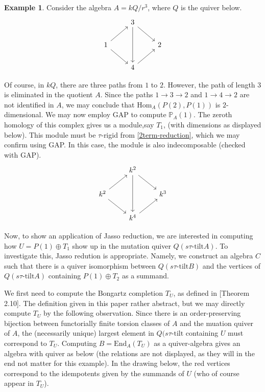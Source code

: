 \documentclass[]{article}
\theoremstyle{definition}
\newtheorem{example}{Example}[section]
\newcommand{\tu}{\ensuremath{\tau}}
\begin{document}
\begin{example}
	Consider the algebra $A = kQ/r^3$, where $Q$ is the quiver below.
	\[\begin{tikzcd}
		& 3 \\
		1 && 2 \\
		& 4
		\arrow[from=2-1, to=1-2]
		\arrow[from=2-1, to=3-2]
		\arrow[from=3-2, to=2-3]
		\arrow[from=1-2, to=2-3]
		\arrow[from=1-2, to=3-2]
	\end{tikzcd}\]

	Of course, in $kQ$, there are three paths from $1$ to $2$. However, the path of length $3$ is eliminated in the quotient $A$. Since the paths $1 \to 3 \to 2$ and $1 \to 4 \to 2$ are not identified in $A$, we may conclude that $\text{Hom}_A(P(2),P(1))$ is $2$-dimensional. We may now employ GAP to compute $\mathbb{P}_A(1)$. The zeroth homology of this complex gives us a module,say $T_1$, (with dimensions as displayed below). This module must be \tu-rigid from \cref{2term-reduction}, which we may confirm using GAP. In this case, the module is also indecomposable (checked with GAP).
	\[\begin{tikzcd}
		& k^2 \\
		k^2 && k^3 \\
		& k^4
		\arrow[from=2-1, to=1-2]
		\arrow[from=2-1, to=3-2]
		\arrow[from=3-2, to=2-3]
		\arrow[from=1-2, to=2-3]
		\arrow[from=1-2, to=3-2]
	\end{tikzcd}\]

Now, to show an application of Jasso reduction, we are interested in computing how $U = P(1) \oplus T_1$ show up in the mutation quiver $Q(s\tu\text{-tilt} A)$. To investigate this, Jasso redution is appropriate. Namely, we construct an algebra $C$ such that there is a quiver isomorphism between $Q(s\tu\text{-tilt} B)$ and the vertices of $Q(s\tu\text{-tilt} A)$ containing $P(1) \oplus T_2$ as a summand.

We first need to compute the Bongartz completion $T_U$, as defined in \cite{tau}[Theorem 2.10]. The definition given in this paper rather abstract, but we may directly compute $T_U$ by the following observation. Since there is an order-preserving bijection between functorially finite torsion classes of $A$ and the muation quiver of $A$, the (necessarily unique) largest element in $Q(s\tu\text{-tilt}$ containing $U$ must correspond to $T_U$. Computing $B = \text{End}_A(T_U)$ as a quiver-algebra gives an algebra with quiver as below (the relations are not displayed, as they will in the end not matter for this example). In the drawing below, the red vertices correspond to the idempotents given by the summands of $U$ (who of course appear in $T_U$).


\end{example}
\end{document}
